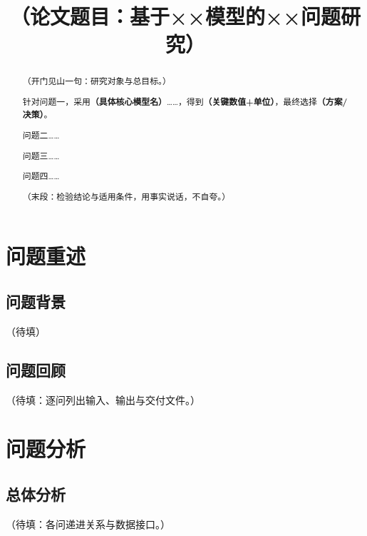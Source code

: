\documentclass[withoutpreface,bwprint]{cumcmthesis}
\title{（论文题目：基于××模型的××问题研究）}
\renewcommand{\textbf}[1]{{\song\bfseries #1}}
\begin{document}
\maketitle

\begin{abstract}
（开门见山一句：研究对象与总目标。）

针对问题一，采用\textbf{\boldmath （具体核心模型名）}……，得到\textbf{\boldmath （关键数值+单位）}，最终选择\textbf{（方案/决策）}。

问题二……

问题三……

问题四……

（末段：检验结论与适用条件，用事实说话，不自夸。）

\end{abstract}

\section{问题重述}

\subsection{问题背景}

（待填）

\subsection{问题回顾}

（待填：逐问列出输入、输出与交付文件。）

\section{问题分析}

\subsection{总体分析}

（待填：各问递进关系与数据接口。）

\end{document}
